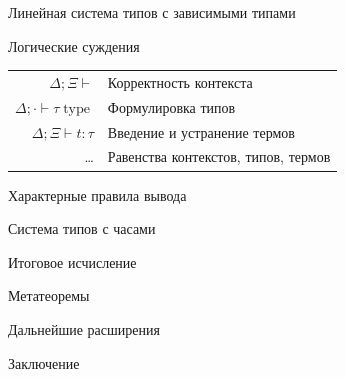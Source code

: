 \documentclass{beamer}
\DeclareMathOperator{\type}{type}
\newcommand{\letin}[3]{\operatorname{let}\,#1=#2\,\operatorname{in}\,#3}
\begin{document}
\begin{frame}{Линейная система типов с зависимыми типами}
  \begin{block}{Логические суждения}
  \begin{center}
  \begin{tabular}{rl}
    $\Delta; \Xi \vdash$ & Корректность контекста \\
    $\Delta; \cdot \vdash \tau \type$ & Формулировка типов \\
    $\Delta; \Xi \vdash t: \tau$ & Введение и устранение термов \\
    \ldots & Равенства контекстов, типов, термов
  \end{tabular}
  \end{center}
  \end{block}
  \begin{block}{Характерные правила вывода}
  \end{block}
\end{frame}

\begin{frame}{Система типов с часами}
\end{frame}

\begin{frame}{Итоговое исчисление}
\end{frame}

\begin{frame}{Метатеоремы}
\end{frame}

\begin{frame}{Дальнейшие расширения}
\end{frame}

\begin{frame}{Заключение}
\end{frame}
\end{document}
